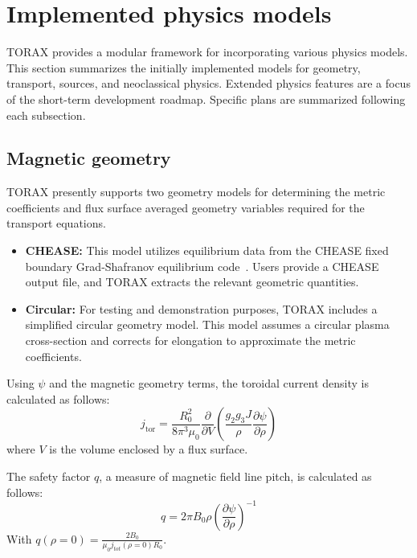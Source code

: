 \documentclass[aps, reprint, nofootinbib]{revtex4-2}
\begin{document}
\section{Implemented physics models}
\label{sec:models}
TORAX provides a modular framework for incorporating various physics models. This section summarizes the initially implemented models for geometry, transport, sources, and neoclassical physics. Extended physics features are a focus of the short-term development roadmap. Specific plans are summarized following each subsection.

\subsection{Magnetic geometry}
TORAX presently supports two geometry models for determining the metric coefficients and flux surface averaged geometry variables required for the transport equations.
\begin{itemize}
    \item \textbf{CHEASE:} This model utilizes equilibrium data from the CHEASE fixed boundary Grad-Shafranov equilibrium code~\cite{lutjens:1996}. Users provide a CHEASE output file, and TORAX extracts the relevant geometric quantities.
    \item \textbf{Circular:} For testing and demonstration purposes, TORAX includes a simplified circular geometry model. This model assumes a circular plasma cross-section and corrects for elongation to approximate the metric coefficients.
\end{itemize}
Using $\psi$ and the magnetic geometry terms, the toroidal current density is calculated as follows:
\begin{equation}
\label{eq:jtot}
j_\mathrm{tor} = \frac{R_0^2}{8\pi^3\mu_0}\frac{\partial }{\partial V}\left(\frac{g_2 g_3 J}{\rho} \frac{\partial \psi}{\partial \rho}\right)
\end{equation}
where $V$ is the volume enclosed by a flux surface.

The safety factor $q$, a measure of magnetic field line pitch, is calculated as follows:
\begin{equation}
\label{eq:q}
q = 2\pi B_0 \rho \left( \frac{\partial \psi}{\partial \rho} \right)^{-1}
\end{equation}
With $q(\rho=0)=\frac{2B_0}{\mu_0 j_{tot}(\rho=0) R_0}$.

\end{document}
